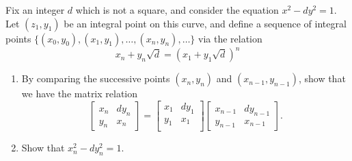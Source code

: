 \documentclass[12 pt, letterpaper]{hmcpset}
\begin{document}
\begin{problem}[3]
	 Fix an integer $d$ which is not a square, and consider the equation $x^{2} - d y^{2} = 1$. Let $(z_{1}, y_{1})$ be an integral point on this curve, and define a sequence of integral points $\{ (x_{0}, y_{0}), (x_{1}, y_{1}), \dots, (x_{n}, y_{n}), \dots \}$ via the relation
	 \[
	 	x_{n} + y_{n} \sqrt{d} = (x_{1} + y_{1} \sqrt{d})^{n}
	 \]
	 \begin{enumerate}
		 \item By comparing the successive points $(x_{n}, y_{n})$ and $(x_{n - 1}, y_{n - 1})$, show that we have the matrix relation
			 \[
			 	\begin{bmatrix}
					x_{n} & d y_{n} \\
					y_{n} & x_{n}
			 	\end{bmatrix} = 
				\begin{bmatrix}
					x_{1} & d y_{1} \\
					y_{1} & x_{1} \\
				\end{bmatrix}
				\begin{bmatrix}
					x_{n - 1} & d y_{n - 1} \\
					y_{n - 1} & x_{n - 1}
				\end{bmatrix}.
			 \]
		\item Show that $x_{n}^{2} - d y_{n}^{2} = 1$.
	 \end{enumerate}
\end{problem}
\end{document}
